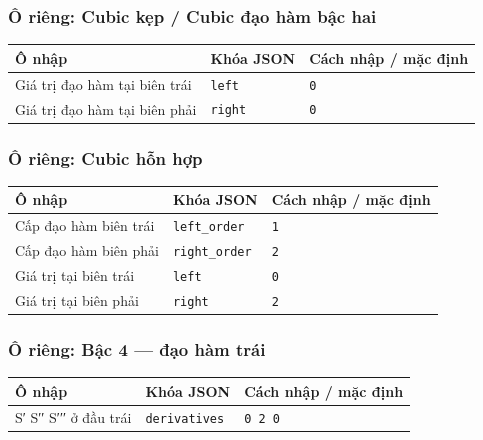 \subsubsection*{Ô riêng: Cubic kẹp /\allowbreak{} Cubic đạo hàm bậc hai}
\begin{center}\small\begin{tabular}{@{}p{.32\linewidth}p{.17\linewidth}p{.43\linewidth}@{}}\toprule
Ô nhập & Khóa JSON & Cách nhập / mặc định\\\midrule
Giá trị đạo hàm tại biên trái & \texttt{left} & \texttt{0}\\[3pt]
Giá trị đạo hàm tại biên phải & \texttt{right} & \texttt{0}\\[3pt]
\bottomrule\end{tabular}\end{center}
\subsubsection*{Ô riêng: Cubic hỗn hợp}
\begin{center}\small\begin{tabular}{@{}p{.32\linewidth}p{.17\linewidth}p{.43\linewidth}@{}}\toprule
Ô nhập & Khóa JSON & Cách nhập / mặc định\\\midrule
Cấp đạo hàm biên trái & \texttt{left\_order} & \texttt{1}\\[3pt]
Cấp đạo hàm biên phải & \texttt{right\_order} & \texttt{2}\\[3pt]
Giá trị tại biên trái & \texttt{left} & \texttt{0}\\[3pt]
Giá trị tại biên phải & \texttt{right} & \texttt{2}\\[3pt]
\bottomrule\end{tabular}\end{center}
\subsubsection*{Ô riêng: Bậc 4 — đạo hàm trái}
\begin{center}\small\begin{tabular}{@{}p{.32\linewidth}p{.17\linewidth}p{.43\linewidth}@{}}\toprule
Ô nhập & Khóa JSON & Cách nhập / mặc định\\\midrule
S′ S′′ S′′′ ở đầu trái & \texttt{derivatives} & \texttt{0 2 0}\\[3pt]
\bottomrule\end{tabular}\end{center}
